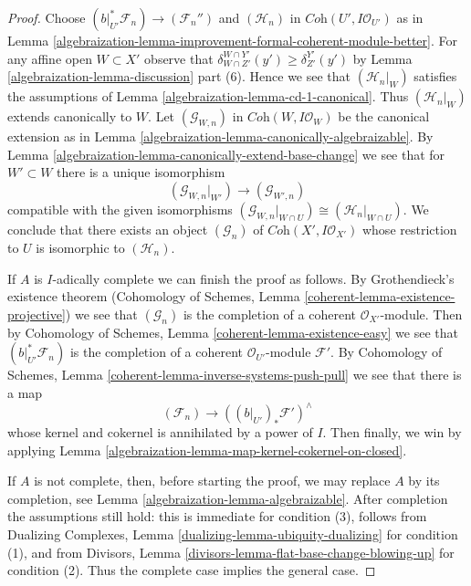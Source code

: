 \begin{proof}
\medskip\noindent
Choose $(b|_{U'}^*\mathcal{F}_n) \to (\mathcal{F}_n'')$
and $(\mathcal{H}_n)$ in $\textit{Coh}(U', I\mathcal{O}_{U'})$
as in Lemma \ref{algebraization-lemma-improvement-formal-coherent-module-better}.
For any affine open $W \subset X'$ observe that
$\delta^{W \cap Y'}_{W \cap Z'}(y') \geq \delta^{Y'}_{Z'}(y')$ by
Lemma \ref{algebraization-lemma-discussion} part (6). Hence we see that
$(\mathcal{H}_n|_W)$ satisfies the assumptions of
Lemma \ref{algebraization-lemma-cd-1-canonical}.
Thus $(\mathcal{H}_n|_W)$ extends canonically to $W$.
Let $(\mathcal{G}_{W, n})$ in $\textit{Coh}(W, I\mathcal{O}_W)$
be the canonical extension as in
Lemma \ref{algebraization-lemma-canonically-algebraizable}.
By Lemma \ref{algebraization-lemma-canonically-extend-base-change}
we see that for $W' \subset W$ there is a unique isomorphism
$$
(\mathcal{G}_{W, n}|_{W'}) \longrightarrow
(\mathcal{G}_{W', n})
$$
compatible with the given isomorphisms
$(\mathcal{G}_{W, n}|_{W \cap U}) \cong (\mathcal{H}_n|_{W \cap U})$.
We conclude that there exists an object
$(\mathcal{G}_n)$ of $\textit{Coh}(X', I\mathcal{O}_{X'})$
whose restriction to $U$ is isomorphic to $(\mathcal{H}_n)$.

\medskip\noindent
If $A$ is $I$-adically complete we can finish the proof as follows.
By Grothendieck's existence theorem
(Cohomology of Schemes, Lemma \ref{coherent-lemma-existence-projective})
we see that $(\mathcal{G}_n)$ is the completion of a coherent
$\mathcal{O}_{X'}$-module. Then by
Cohomology of Schemes, Lemma \ref{coherent-lemma-existence-easy}
we see that $(b|_{U'}^*\mathcal{F}_n)$
is the completion of a coherent $\mathcal{O}_{U'}$-module
$\mathcal{F}'$.
By Cohomology of Schemes, Lemma \ref{coherent-lemma-inverse-systems-push-pull}
we see that there is a map
$$
(\mathcal{F}_n) \longrightarrow ((b|_{U'})_*\mathcal{F}')^\wedge
$$
whose kernel and cokernel is annihilated by a power of $I$.
Then finally, we win by applying
Lemma \ref{algebraization-lemma-map-kernel-cokernel-on-closed}.

\medskip\noindent
If $A$ is not complete, then, before starting the proof, we may replace $A$
by its completion, see Lemma \ref{algebraization-lemma-algebraizable}.
After completion the assumptions still hold: this is immediate
for condition (3), follows from
Dualizing Complexes, Lemma \ref{dualizing-lemma-ubiquity-dualizing}
for condition (1), and from
Divisors, Lemma \ref{divisors-lemma-flat-base-change-blowing-up}
for condition (2).
Thus the complete case implies the general case.
\end{proof}

